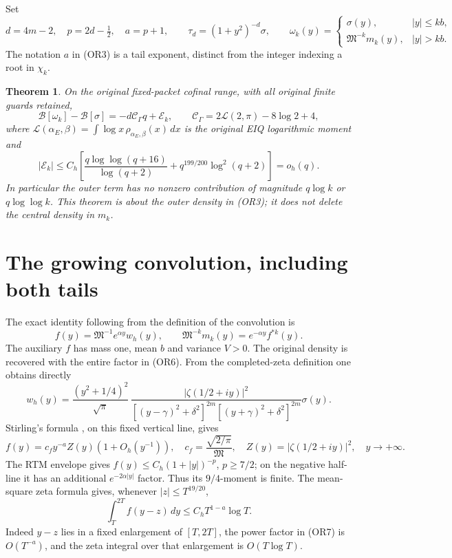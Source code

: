 \documentclass[11pt]{article}
\newtheorem{theorem}{Theorem}
\newcommand{\MM}{\mathfrak M}
\newcommand{\BB}{\mathcal B}
\begin{document}
Set
\[
 d=4m-2,\quad p=2d-\tfrac12,\quad a=p+1,\qquad
 \tau_d=(1+y^2)^{-d}\sigma,\qquad
 \omega_k(y)=
 \begin{cases}\sigma(y),&|y|\leq kb,\\
 \MM^{-k}m_k(y),&|y|>kb.\end{cases}                    \tag{OR3}
\]
The notation \(a\) in (OR3) is a tail exponent, distinct from the
integer indexing a root in \(\chi_k\).

\begin{theorem}
On the original fixed-packet cofinal range, with all original finite
guards retained,
\[
 \BB[\omega_k]-\BB[\sigma]
 =-d\mathcal C_\Gamma q+\mathcal E_k,\qquad
 \mathcal C_\Gamma=2\mathcal L(2,\pi)-8\log2+4,          \tag{OR4}
\]
where \(\mathcal L(\alpha_E,\beta)=\int\log x\,\rho_{\alpha_E,\beta}(x)\,dx\)
is the original EIQ logarithmic moment and
\[
 |\mathcal E_k|\leq C_h\left[
 \frac{q\log\log(q+16)}{\log(q+2)}
 +q^{199/200}\log^2(q+2)\right]=o_h(q).                \tag{OR5}
\]
In particular the outer term has no nonzero contribution of magnitude
\(q\log k\) or \(q\log\log k\).  This theorem is about the outer density
in (OR3); it does not delete the central density in \(m_k\).
\end{theorem}

\section{The growing convolution, including both tails}
The exact identity following from the definition of the convolution is
\[
 f(y)=\MM^{-1}e^{\alpha y}w_h(y),\qquad
 \MM^{-k}m_k(y)=e^{-\alpha y}f^{*k}(y).                \tag{OR6}
\]
The auxiliary \(f\) has mass one, mean \(b\) and variance \(V>0\).
The original density is recovered with the entire factor in (OR6).
From the completed-zeta definition one obtains directly
\[
 w_h(y)=\frac{(y^2+1/4)^2}{\sqrt\pi}\,
 \frac{|\zeta(1/2+iy)|^2}
 {[(y-\gamma)^2+\delta^2]^{2m}[(y+\gamma)^2+\delta^2]^{2m}}\sigma(y).
\]
Stirling's formula \cite{DLMFgamma}, on this fixed vertical line, gives
\[
 f(y)=c_fy^{-a}Z(y)(1+O_h(y^{-1})),\quad
 c_f=\frac{\sqrt{2/\pi}}{\MM},\quad
 Z(y)=|\zeta(1/2+iy)|^2,\quad y\longrightarrow+\infty. \tag{OR7}
\]
The RTM envelope gives \(f(y)\leq C_h(1+|y|)^{-p}\), \(p\geq7/2\);
on the negative half-line it has an additional
\(e^{-2\alpha|y|}\) factor.  Thus its \(9/4\)-moment is finite.
The mean-square zeta formula gives, whenever \(|z|\leq T^{19/20}\),
\[
 \int_T^{2T}f(y-z)\,dy\leq C_h T^{1-a}\log T.          \tag{OR8}
\]
Indeed \(y-z\) lies in a fixed enlargement of \([T,2T]\), the power
factor in (OR7) is \(O(T^{-a})\), and the zeta integral over that
enlargement is \(O(T\log T)\).
\end{document}
